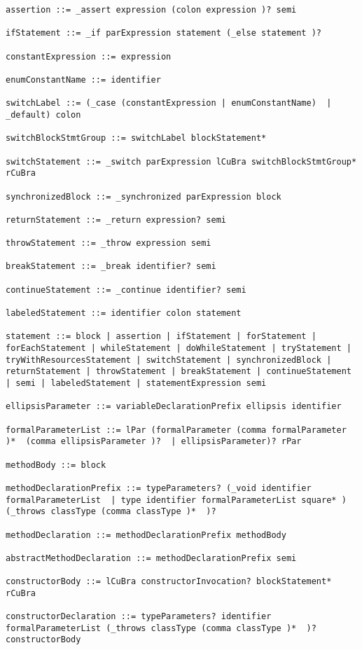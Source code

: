 \begin{lstlisting}[breaklines=true]
assertion ::= _assert expression (colon expression )? semi

ifStatement ::= _if parExpression statement (_else statement )?

constantExpression ::= expression

enumConstantName ::= identifier

switchLabel ::= (_case (constantExpression | enumConstantName)  | _default) colon

switchBlockStmtGroup ::= switchLabel blockStatement*

switchStatement ::= _switch parExpression lCuBra switchBlockStmtGroup* rCuBra

synchronizedBlock ::= _synchronized parExpression block

returnStatement ::= _return expression? semi

throwStatement ::= _throw expression semi

breakStatement ::= _break identifier? semi

continueStatement ::= _continue identifier? semi

labeledStatement ::= identifier colon statement

statement ::= block | assertion | ifStatement | forStatement | forEachStatement | whileStatement | doWhileStatement | tryStatement | tryWithResourcesStatement | switchStatement | synchronizedBlock | returnStatement | throwStatement | breakStatement | continueStatement | semi | labeledStatement | statementExpression semi

ellipsisParameter ::= variableDeclarationPrefix ellipsis identifier

formalParameterList ::= lPar (formalParameter (comma formalParameter )*  (comma ellipsisParameter )?  | ellipsisParameter)? rPar

methodBody ::= block

methodDeclarationPrefix ::= typeParameters? (_void identifier formalParameterList  | type identifier formalParameterList square* ) (_throws classType (comma classType )*  )?

methodDeclaration ::= methodDeclarationPrefix methodBody

abstractMethodDeclaration ::= methodDeclarationPrefix semi

constructorBody ::= lCuBra constructorInvocation? blockStatement* rCuBra

constructorDeclaration ::= typeParameters? identifier formalParameterList (_throws classType (comma classType )*  )? constructorBody


\end{lstlisting}
